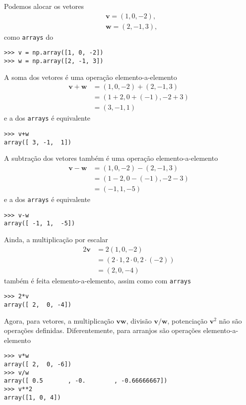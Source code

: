 \begin{ex}
  Podemos alocar os vetores
  \begin{align}
    &\pmb{v} = (1, 0, -2),\\
    &\pmb{w} = (2, -1, 3),
  \end{align}
  como \lstinline+arrays+ do {\numpy}
\begin{lstlisting}
>>> v = np.array([1, 0, -2])
>>> w = np.array([2, -1, 3])
\end{lstlisting}

  A soma dos vetores é uma operação elemento-a-elemento
  \begin{subequations}
    \begin{align}
      \pmb{v}+\pmb{w} &= (1, 0, -2) + (2, -1, 3)\\
                      &= \left(1+2, 0+(-1), -2+3\right)\\
                      &= (3, -1, 1)
    \end{align}
  \end{subequations}
  e a dos \lstinline+arrays+ é equivalente
\begin{lstlisting}
>>> v+w
array([ 3, -1,  1])
\end{lstlisting}

  A subtração dos vetores também é uma operação elemento-a-elemento
  \begin{subequations}
    \begin{align}
      \pmb{v}-\pmb{w} &= (1, 0, -2) - (2, -1, 3)\\
                      &= \left(1-2, 0-(-1), -2-3\right)\\
                      &= (-1, 1, -5)
    \end{align}
  \end{subequations}
  e a dos \lstinline+arrays+ é equivalente
\begin{lstlisting}
>>> v-w
array([ -1, 1,  -5])
\end{lstlisting}

  Ainda, a multiplicação por escalar
  \begin{subequations}
    \begin{align}
      2\pmb{v} &= 2(1, 0, -2)\\
               &= \left(2\cdot 1, 2\cdot 0, 2\cdot(-2)\right)\\
               &= (2, 0, -4)
    \end{align}
  \end{subequations}
  também é feita elemento-a-elemento, assim como com \lstinline+arrays+
\begin{lstlisting}
>>> 2*v
array([ 2,  0, -4])
\end{lstlisting}

  Agora, para vetores, a multiplicação $\pmb{v}\pmb{w}$, divisão $\pmb{v}/\pmb{w}$, potenciação $\pmb{v}^2$ não são operações definidas. Diferentemente, para arranjos são operações elemento-a-elemento
\begin{lstlisting}
>>> v*w
array([ 2,  0, -6])
>>> v/w
array([ 0.5       , -0.        , -0.66666667])
>>> v**2
array([1, 0, 4])
\end{lstlisting}
\end{ex}

